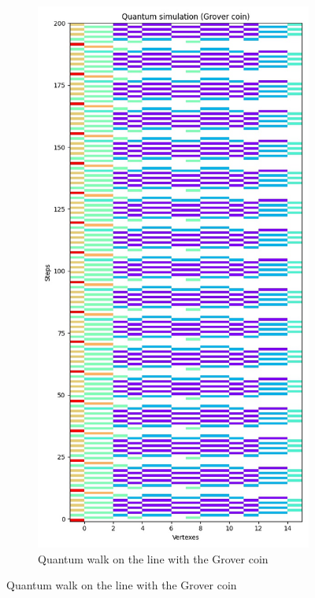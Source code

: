 \begin{figure}[H]
  \centering
  \begin{subfigure}{.45\linewidth}
    \centering
    \includegraphics[width=\linewidth]{./figures/results/hypercube/grover.jpg}
    \caption{Quantum walk on the line with the Grover coin}

\end{subfigure}
\end{figure}
